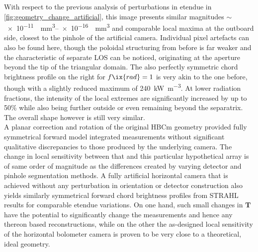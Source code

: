             With respect to the previous analysis of perturbations in etendue in \cref{fig:geometry_change_artificial}, this image presents similar magnitudes $\sim$\SIrange[per-mode=reciprocal]{e-11}{e-16}{\per\cubic\milli\meter} and comparable local maxima at the outboard side, closest to the pinhole of the artificial camera. Individual pixel artefacts can also be found here, though the poloidal structuring from before is far weaker and the characteristic of separate LOS can be noticed, originating at the aperture beyond the tip of the triangular domain. The also perfectly symmetric chord brightness profile on the right for $f\ix{rad}=1$ is very akin to the one before, though with a slightly reduced maximum of \SI{240}{\kilo\watt\per\cubic\meter}. At lower radiation fractions, the intensity of the local extremes are significantly increased by up to 50\% while also being further outside or even remaining beyond the separatrix. The overall shape however is still very similar.\\%
            A planar correction and rotation of the original HBCm geometry provided fully symmetrical forward model integrated measurements without significant qualitative discrepancies to those produced by the underlying camera. The change in local sensitivity between that and this particular hypothetical array is of same order of magnitude as the differences created by varying detector and pinhole segmentation methods. A fully artificial horizontal camera that is achieved without any perturbation in orientation or detector construction also yields similarly symmetrical forward chord brightness profiles from STRAHL results for comparable etendue variations. On one hand, such small changes in $\mathbf{T}$ have the potential to significantly change the measurements and hence any thereon based reconstructions, while on the other the as-designed local sensitivity of the horizontal bolometer camera is proven to be very close to a theoretical, ideal geometry.%
%
